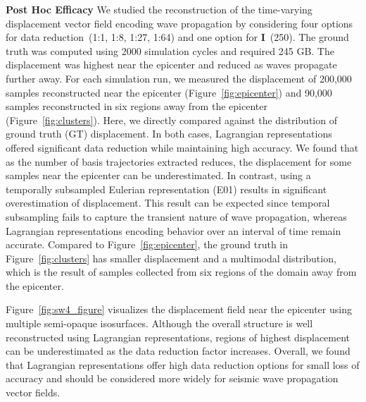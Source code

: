 \noindent\textbf{Post Hoc Efficacy}
We studied the reconstruction of the time-varying displacement vector field encoding wave propagation by considering four options for data reduction~(1:1, 1:8, 1:27, 1:64) and one option for \textbf{I}~(250).
%
The ground truth was computed using 2000 simulation cycles and required 245 GB.
%
The displacement was highest near the epicenter and reduced as waves propagate further away.
%
For each simulation run, we measured the displacement of 200,000 samples reconstructed near the epicenter (Figure~\ref{fig:epicenter}) and 90,000 samples reconstructed in six regions away from the epicenter (Figure~\ref{fig:clusters}).
%
Here, we directly compared against the distribution of ground truth (GT) displacement.
%
In both cases, Lagrangian representations offered significant data reduction while maintaining high accuracy.
%
We found that as the number of basis trajectories extracted reduces, the displacement for some samples near the epicenter can be underestimated. 
%
In contrast, using a temporally subsampled Eulerian representation (E01) results in significant overestimation of displacement.
%
This result can be expected since temporal subsampling fails to capture the transient nature of wave propagation, whereas Lagrangian representations encoding behavior over an interval of time remain accurate.
%
Compared to Figure~\ref{fig:epicenter}, the ground truth in Figure~\ref{fig:clusters} has smaller displacement and a multimodal distribution, which is the result of samples collected from six regions of the domain away from the epicenter. 
%

Figure~\ref{fig:sw4_figure} visualizes the displacement field near the epicenter using multiple semi-opaque isosurfaces.
%
Although the overall structure is well reconstructed using Lagrangian representations, regions of highest displacement can be underestimated as the data reduction factor increases.
%
Overall, we found that Lagrangian representations offer high data reduction options for small loss of accuracy and should be considered more widely for seismic wave propagation vector fields.


